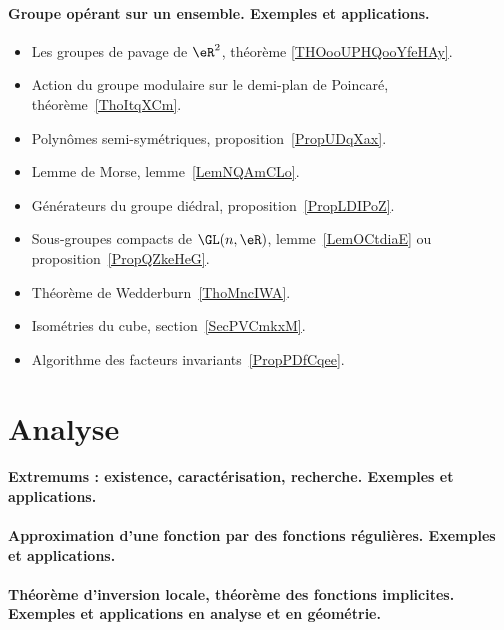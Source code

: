 \paragraph{Groupe opérant sur un ensemble. Exemples et applications.}
\begin{itemize}
    \item Les groupes de pavage de \( \eR^2\), théorème \ref{THOooUPHQooYfeHAy}.
    \item Action du groupe modulaire sur le demi-plan de Poincaré, théorème~\ref{ThoItqXCm}.
    \item Polynômes semi-symétriques, proposition~\ref{PropUDqXax}.
    \item Lemme de Morse, lemme~\ref{LemNQAmCLo}.
    \item Générateurs du groupe diédral, proposition~\ref{PropLDIPoZ}.
    \item Sous-groupes compacts de \( \GL(n,\eR)\), lemme~\ref{LemOCtdiaE} ou proposition~\ref{PropQZkeHeG}.
    \item Théorème de Wedderburn~\ref{ThoMncIWA}.
    \item Isométries du cube, section~\ref{SecPVCmkxM}.
    \item Algorithme des facteurs invariants~\ref{PropPDfCqee}.
\end{itemize}


\section{Analyse}

\paragraph{Extremums : existence, caractérisation, recherche. Exemples et applications.}
\paragraph{Approximation d'une fonction par des fonctions régulières.  Exemples et applications.}
\paragraph{Théorème d'inversion locale, théorème des fonctions implicites. Exemples et applications en analyse et en géométrie.}

